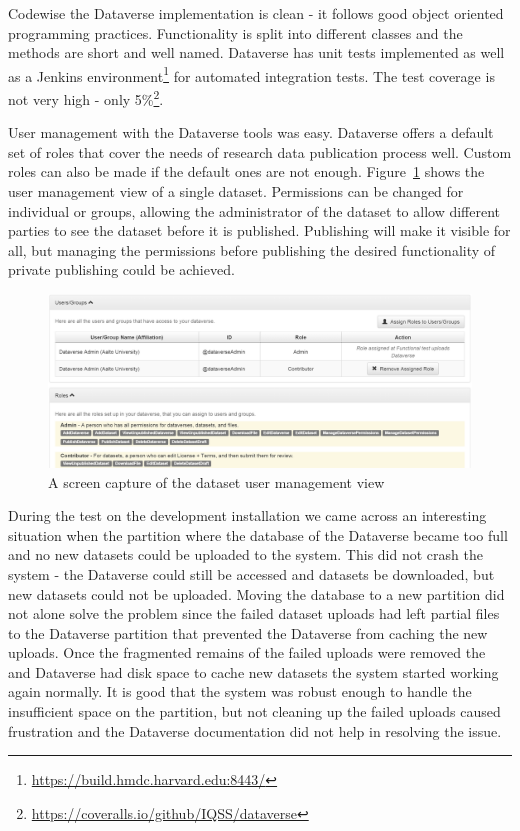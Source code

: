 Codewise the Dataverse implementation is clean - it follows good object
oriented programming practices. Functionality is split into different
classes and the methods are short and well named. Dataverse has unit
tests implemented as well as a Jenkins
environment\footnote{\url{https://build.hmdc.harvard.edu:8443/}} for automated
integration tests. The test coverage is not very high - only
5\%\footnote{\url{https://coveralls.io/github/IQSS/dataverse}}.

User management with the Dataverse tools was easy. Dataverse offers a default
set of roles that cover the needs of research data publication process well.
Custom roles can also be made if the default ones are not enough.
Figure~\ref{fig:admin} shows the user management view of a single dataset. Permissions
can be changed for individual or groups, allowing the administrator of the
dataset to allow different parties to see the dataset before it is published.
Publishing will make it visible for all, but managing the permissions before
publishing the desired functionality of private publishing could be achieved.

\begin{figure}
    \begin{centering}
        \includegraphics[width=\textwidth]{images/admin}
    \end{centering}
    \caption{A screen capture of the dataset user management view}
    \label{fig:admin}
\end{figure}

During the test on the development installation we came across an interesting
situation when the partition where the database of the Dataverse became too
full and no new datasets could be uploaded to the system. This did not crash
the system - the Dataverse could still be accessed and datasets be downloaded,
but new datasets could not be uploaded. Moving the database to a new partition
did not alone solve the problem since the failed dataset uploads had left
partial files to the Dataverse partition that prevented the Dataverse from
caching the new uploads. Once the fragmented remains of the failed uploads
were removed the and Dataverse had disk space to cache new datasets the system
started working again normally. It is good that the system was robust enough
to handle the insufficient space on the partition, but not cleaning up the
failed uploads caused frustration and the Dataverse documentation did not
help in resolving the issue.

